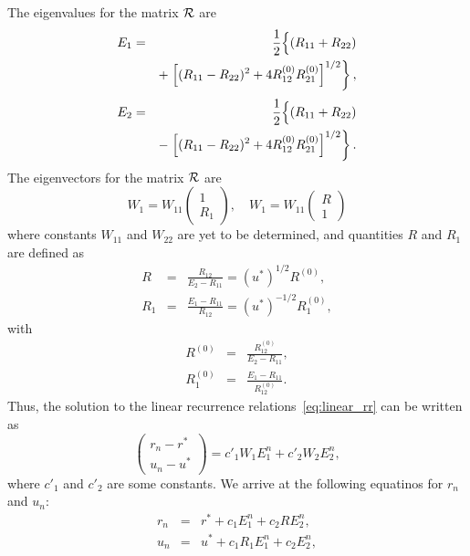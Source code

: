 The eigenvalues for the matrix $\cal{R}$ are
\begin{eqnarray*}
	E_1 & = &  \frac{1}{2} \Bigl\{ (R_{11} + R_{22})
	\\
	&& + \left. \left[(R_{11} - R_{22})^2 + 4 R_{12}^{(0)}R_{21}^{(0)}\right]^{1/2}\right\},
\end{eqnarray*}
\begin{eqnarray*}
	E_2 & = & \frac{1}{2} \Bigl\{ (R_{11} + R_{22}) 
	\\
	&& - \left. \left[(R_{11} - R_{22})^2 + 4 R_{12}^{(0)}R_{21}^{(0)}\right]^{1/2}\right\}.
\end{eqnarray*}
The eigenvectors for the matrix $\cal{R}$ are
\begin{equation*}
	W_1 = W_{11} \left(
	\begin{array}{ll}
		1 
		\\ 
		R_1
	\end{array}
	\right)
	, \quad
	W_1 = W_{11} \left(
	\begin{array}{ll}
		R 
		\\ 
		1
	\end{array}
	\right)
\end{equation*}
where constants $W_{11}$ and $W_{22}$ are yet to be determined, and quantities $R$ and $R_1$ are defined as
\begin{eqnarray*}
	R & = & \frac{R_{12}}{E_2 - R_{11}} = (u^*)^{1/2}R^{(0)}, 
	\\
	R_1 & = & \frac{E_1 - R_{11}}{R_{12}} = (u^*)^{-1/2}R_1^{(0)},
\end{eqnarray*}
with
\begin{eqnarray*}
	R^{(0)} & = & \frac{R_{12}^{(0)}}{E_2 - R_{11}},
	\\
	R_1^{(0)} & = & \frac{E_1 - R_{11}}{R_{12}^{(0)}}.
\end{eqnarray*}
Thus, the solution to the linear recurrence relations~\eqref{eq:linear_rr} can be written as
\begin{equation}
	\left(
	\begin{array}{ll}
		r_n - r^*
		\\
		u_n - u^*
	\end{array}
	\right)
	= c'_1 W_1 E_1^n + c'_2 W_2 E_2^n,
\end{equation}
where $c'_1$ and $c'_2$ are some constants. We arrive at the following equatinos for $r_n$ and $u_n$:
\begin{eqnarray}
	r_n & = & r^* + c_1 E_1^n + c_2 R E_2^n,
	\nonumber \\
	u_n & = & u^* + c_1 R_1 E_1^n + c_2 E_2^n,
\end{eqnarray}
